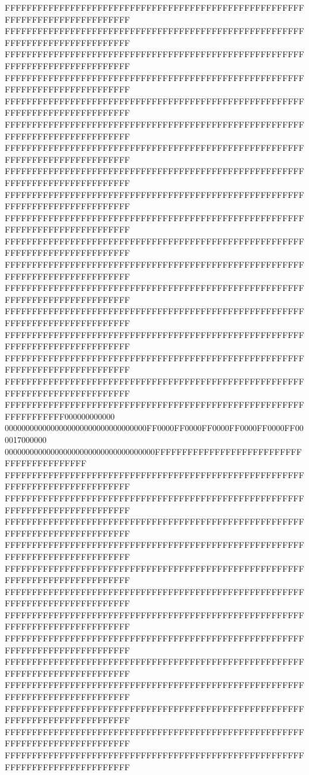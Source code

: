 FFFFFFFFFFFFFFFFFFFFFFFFFFFFFFFFFFFFFFFFFFFFFFFFFFFFFFFFFFFFFFFFFFFFFFFFFFFFFF
FFFFFFFFFFFFFFFFFFFFFFFFFFFFFFFFFFFFFFFFFFFFFFFFFFFFFFFFFFFFFFFFFFFFFFFFFFFFFF
FFFFFFFFFFFFFFFFFFFFFFFFFFFFFFFFFFFFFFFFFFFFFFFFFFFFFFFFFFFFFFFFFFFFFFFFFFFFFF
FFFFFFFFFFFFFFFFFFFFFFFFFFFFFFFFFFFFFFFFFFFFFFFFFFFFFFFFFFFFFFFFFFFFFFFFFFFFFF
FFFFFFFFFFFFFFFFFFFFFFFFFFFFFFFFFFFFFFFFFFFFFFFFFFFFFFFFFFFFFFFFFFFFFFFFFFFFFF
FFFFFFFFFFFFFFFFFFFFFFFFFFFFFFFFFFFFFFFFFFFFFFFFFFFFFFFFFFFFFFFFFFFFFFFFFFFFFF
FFFFFFFFFFFFFFFFFFFFFFFFFFFFFFFFFFFFFFFFFFFFFFFFFFFFFFFFFFFFFFFFFFFFFFFFFFFFFF
FFFFFFFFFFFFFFFFFFFFFFFFFFFFFFFFFFFFFFFFFFFFFFFFFFFFFFFFFFFFFFFFFFFFFFFFFFFFFF
FFFFFFFFFFFFFFFFFFFFFFFFFFFFFFFFFFFFFFFFFFFFFFFFFFFFFFFFFFFFFFFFFFFFFFFFFFFFFF
FFFFFFFFFFFFFFFFFFFFFFFFFFFFFFFFFFFFFFFFFFFFFFFFFFFFFFFFFFFFFFFFFFFFFFFFFFFFFF
FFFFFFFFFFFFFFFFFFFFFFFFFFFFFFFFFFFFFFFFFFFFFFFFFFFFFFFFFFFFFFFFFFFFFFFFFFFFFF
FFFFFFFFFFFFFFFFFFFFFFFFFFFFFFFFFFFFFFFFFFFFFFFFFFFFFFFFFFFFFFFFFFFFFFFFFFFFFF
FFFFFFFFFFFFFFFFFFFFFFFFFFFFFFFFFFFFFFFFFFFFFFFFFFFFFFFFFFFFFFFFFFFFFFFFFFFFFF
FFFFFFFFFFFFFFFFFFFFFFFFFFFFFFFFFFFFFFFFFFFFFFFFFFFFFFFFFFFFFFFFFFFFFFFFFFFFFF
FFFFFFFFFFFFFFFFFFFFFFFFFFFFFFFFFFFFFFFFFFFFFFFFFFFFFFFFFFFFFFFFFFFFFFFFFFFFFF
FFFFFFFFFFFFFFFFFFFFFFFFFFFFFFFFFFFFFFFFFFFFFFFFFFFFFFFFFFFFFFFFFFFFFFFFFFFFFF
FFFFFFFFFFFFFFFFFFFFFFFFFFFFFFFFFFFFFFFFFFFFFFFFFFFFFFFFFFFFFFFFFFFFFFFFFFFFFF
FFFFFFFFFFFFFFFFFFFFFFFFFFFFFFFFFFFFFFFFFFFFFFFFFFFFFFFFFFFFFFFFFF000000000000
0000000000000000000000000000000000FF0000FF0000FF0000FF0000FF0000FF000017000000
000000000000000000000000000000000000FFFFFFFFFFFFFFFFFFFFFFFFFFFFFFFFFFFFFFFFFF
FFFFFFFFFFFFFFFFFFFFFFFFFFFFFFFFFFFFFFFFFFFFFFFFFFFFFFFFFFFFFFFFFFFFFFFFFFFFFF
FFFFFFFFFFFFFFFFFFFFFFFFFFFFFFFFFFFFFFFFFFFFFFFFFFFFFFFFFFFFFFFFFFFFFFFFFFFFFF
FFFFFFFFFFFFFFFFFFFFFFFFFFFFFFFFFFFFFFFFFFFFFFFFFFFFFFFFFFFFFFFFFFFFFFFFFFFFFF
FFFFFFFFFFFFFFFFFFFFFFFFFFFFFFFFFFFFFFFFFFFFFFFFFFFFFFFFFFFFFFFFFFFFFFFFFFFFFF
FFFFFFFFFFFFFFFFFFFFFFFFFFFFFFFFFFFFFFFFFFFFFFFFFFFFFFFFFFFFFFFFFFFFFFFFFFFFFF
FFFFFFFFFFFFFFFFFFFFFFFFFFFFFFFFFFFFFFFFFFFFFFFFFFFFFFFFFFFFFFFFFFFFFFFFFFFFFF
FFFFFFFFFFFFFFFFFFFFFFFFFFFFFFFFFFFFFFFFFFFFFFFFFFFFFFFFFFFFFFFFFFFFFFFFFFFFFF
FFFFFFFFFFFFFFFFFFFFFFFFFFFFFFFFFFFFFFFFFFFFFFFFFFFFFFFFFFFFFFFFFFFFFFFFFFFFFF
FFFFFFFFFFFFFFFFFFFFFFFFFFFFFFFFFFFFFFFFFFFFFFFFFFFFFFFFFFFFFFFFFFFFFFFFFFFFFF
FFFFFFFFFFFFFFFFFFFFFFFFFFFFFFFFFFFFFFFFFFFFFFFFFFFFFFFFFFFFFFFFFFFFFFFFFFFFFF
FFFFFFFFFFFFFFFFFFFFFFFFFFFFFFFFFFFFFFFFFFFFFFFFFFFFFFFFFFFFFFFFFFFFFFFFFFFFFF
FFFFFFFFFFFFFFFFFFFFFFFFFFFFFFFFFFFFFFFFFFFFFFFFFFFFFFFFFFFFFFFFFFFFFFFFFFFFFF
FFFFFFFFFFFFFFFFFFFFFFFFFFFFFFFFFFFFFFFFFFFFFFFFFFFFFFFFFFFFFFFFFFFFFFFFFFFFFF
